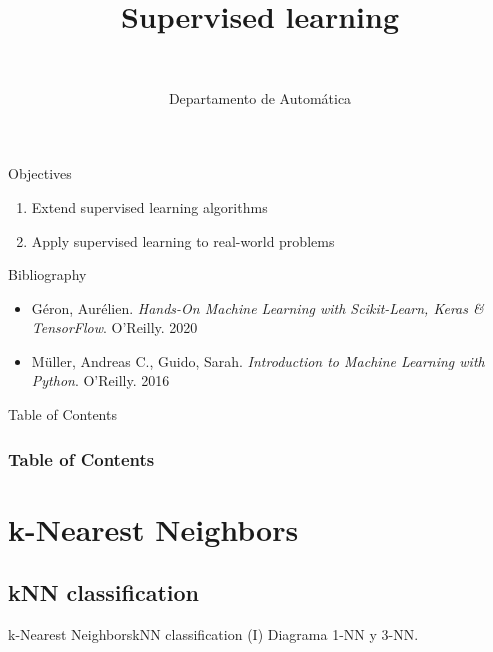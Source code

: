 \documentclass[10pt,compress]{beamer} %
\title[Supervised learning]{Supervised learning}
\author{\asignatura\\\carrera}
\institute{}
\date{Departamento de Automática}
\begin{document}
{\titlepageBlue
    \begin{frame}
        \titlepage
    \end{frame}
}

\institute{\asignatura}

\begin{frame}[plain]{}
   \begin{block}{Objectives}
      \begin{enumerate}
         \item Extend supervised learning algorithms
         \item Apply supervised learning to real-world problems
      \end{enumerate} 
   \end{block}

   \begin{block}{Bibliography}
    \begin{itemize}
        \item G\'eron, Aur\'elien. \textit{Hands-On Machine Learning with Scikit-Learn, Keras \& TensorFlow}. O'Reilly. 2020
        \item M\"uller, Andreas C., Guido, Sarah. \textit{Introduction to Machine Learning with Python}. O'Reilly. 2016
    \end{itemize}
   \end{block}
\end{frame}

{
\begin{frame}[shrink]{Table of Contents}

 	\frametitle{Table of Contents}
  	\begin{multicols}{2}
  		\tableofcontents
    \end{multicols}

\end{frame}
}

\section{k-Nearest Neighbors}
\subsection{kNN classification}

\begin{frame}{k-Nearest Neighbors}{kNN classification (I)}
    Diagrama 1-NN y 3-NN.
\end{frame}
\end{document}
